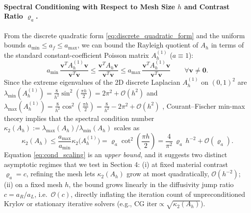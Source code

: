 \documentclass[11pt,a4paper]{article}
\theoremstyle{definition}
\theoremstyle{remark}
\begin{document}
\paragraph{Spectral Conditioning with Respect to Mesh Size $h$ and Contrast Ratio $\varrho_a$.}
From the discrete quadratic form \eqref{eq:discrete_quadratic_form} and the uniform bounds $a_{\min} \le a_f \le a_{\max}$, we can bound the Rayleigh quotient of $A_h$ in terms of the standard constant-coefficient Poisson matrix $A_h^{(1)}$ ($a \equiv 1$):
\begin{equation}
    a_{\min}\,\frac{\bm{v}^T A_h^{(1)} \bm{v}}{\bm{v}^T \bm{v}} \le \frac{\bm{v}^T A_h \bm{v}}{\bm{v}^T \bm{v}} \le a_{\max}\,\frac{\bm{v}^T A_h^{(1)} \bm{v}}{\bm{v}^T \bm{v}} \qquad \forall \bm{v} \ne \bm{0}.
    \label{eq:rayleigh_bounds}
\end{equation}
Since the extreme eigenvalues of the 2D discrete Laplacian $A_h^{(1)}$ on $(0,1)^2$ are $\lambda_{\min}(A_h^{(1)}) = \frac{8}{h^2}\sin^2(\frac{\pi h}{2}) = 2\pi^2 + \mathcal{O}(h^2)$ and $\lambda_{\max}(A_h^{(1)}) = \frac{8}{h^2}\cos^2(\frac{\pi h}{2}) = \frac{8}{h^2} - 2\pi^2 + \mathcal{O}(h^2)$ \cite{quarteroni2017}, Courant--Fischer min-max theory implies that the spectral condition number $\kappa_2(A_h) := \lambda_{\max}(A_h)/\lambda_{\min}(A_h)$ scales as
\begin{equation}
    \kappa_2(A_h) \le \frac{a_{\max}}{a_{\min}}\kappa_2\bigl(A_h^{(1)}\bigr) = \varrho_a \cot^2\!\left(\frac{\pi h}{2}\right) = \frac{4}{\pi^2}\,\varrho_a\, h^{-2} + \mathcal{O}(\varrho_a).
    \label{eq:cond_scaling}
\end{equation}
Equation \eqref{eq:cond_scaling} is an \emph{upper bound}, and it suggests two distinct asymptotic regimes that we test in Section 4: (i) at fixed material contrast $\varrho_a = c$, refining the mesh lets $\kappa_2(A_h)$ grow at most quadratically, $\mathcal{O}(h^{-2})$; (ii) on a fixed mesh $h$, the bound grows linearly in the diffusivity jump ratio $c = a_R/a_L$, i.e.\ $\mathcal{O}(c)$, directly inflating the iteration count of unpreconditioned Krylov or stationary iterative solvers (e.g., $\text{CG iter} \propto \sqrt{\kappa_2(A_h)}$).
\end{document}
